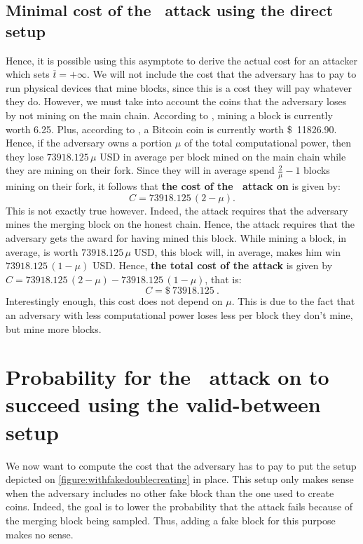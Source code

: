 \subsection{Minimal cost of the \cs\ attack using the direct setup}

Hence, it is possible using this asymptote to derive the actual cost for an attacker which sets \(\overline{t}=+\infty\). We will not include the cost that the adversary has to pay to run physical devices that mine blocks, since this is a cost they will pay whatever they do. However, we must take into account the coins that the adversary loses by not mining on the main chain. According to \cite{BlockReward}, mining a block is currently worth \SI{6.25}{\bitcoin}. Plus, according to \cite{BitcoinValue}, a Bitcoin coin is currently worth \SI{11826.90}[\$]{}. Hence, if the adversary owns a portion \(\mu\) of the total computational power, then they lose \(\num{73918.125}\,\mu\) USD in average per block mined on the main chain while they are mining on their fork. Since they will in average spend \(\frac{2}{\mu}-1\) blocks mining on their fork, it follows that \textbf{the cost of the \cs\ attack on \FC} is given by:
\[C=\num{73918.125}\,(2-\mu).\]
This is not exactly true however. Indeed, the attack requires that the adversary mines the merging block on the honest chain. Hence, the attack requires that the adversary gets the award for having mined this block. While mining a block, in average, is worth \(\num{73918.125}\,\mu\) USD, this block will, in average, makes him win \(\num{73918.125}\,(1-\mu)\) USD. Hence, \textbf{the total cost of the attack} is given by  \(C=\num{73918.125}\,(2-\mu) - \num{73918.125}\,(1-\mu)\), that is:
\[C=\SI{73918.125}[\$]{}.\]
Interestingly enough, this cost does not depend on \(\mu\). This is due to the fact that an adversary with less computational power loses less per block they don't mine, but mine more blocks.
    
\section{Probability for the \cs\ attack on \FC to succeed using the valid-between setup}
\label{section:secondsetup}
We now want to compute the cost that the adversary has to pay to put the setup depicted on \autoref{figure:withfakedoublecreating} in place. This setup only makes sense when the adversary includes no other fake block than the one used to create coins. Indeed, the goal is to lower the probability that the attack fails because of the merging block being sampled. Thus, adding a fake block for this purpose makes no sense.

